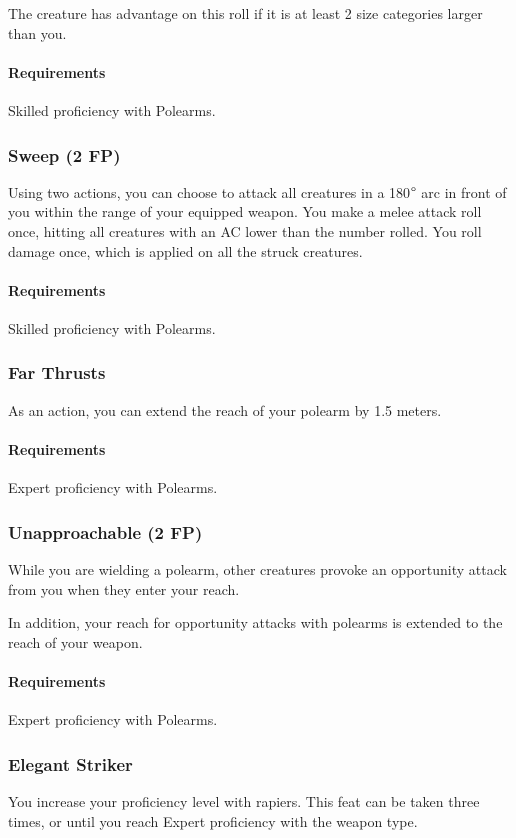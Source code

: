     The creature has advantage on this roll if it is at least 2 size categories larger than you.
    \paragraph{Requirements} Skilled proficiency with Polearms.
\subsubsection{Sweep (2 FP)} \label{feat::sweep}
    Using two actions, you can choose to attack all creatures in a 180$\degree$ arc in front of you within the range of your equipped weapon.
    You make a melee attack roll once, hitting all creatures with an AC lower than the number rolled.
    You roll damage once, which is applied on all the struck creatures.
    \paragraph{Requirements} Skilled proficiency with Polearms.
\subsubsection{Far Thrusts} \label{feat::farthrusts}
    As an action, you can extend the reach of your polearm by 1.5 meters.
    \paragraph{Requirements} Expert proficiency with Polearms.
\subsubsection{Unapproachable (2 FP)} \label{feat::unapproachable}
    While you are wielding a polearm, other creatures provoke an opportunity attack from you when they enter your reach.

    In addition, your reach for opportunity attacks with polearms is extended to the reach of your weapon.
    \paragraph{Requirements} Expert proficiency with Polearms.
\subsubsection{Elegant Striker} \label{feat::elegantstriker}
    You increase your proficiency level with rapiers.
    This feat can be taken three times, or until you reach Expert proficiency with the weapon type.
